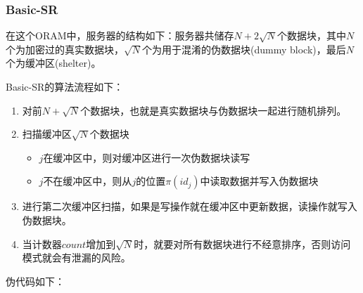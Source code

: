 \subsubsection{Basic-SR}
在这个ORAM中，服务器的结构如下：服务器共储存$N+2\sqrt{N}$个数据块，其中$N$个为加密过的真实数据块，$\sqrt{N}$个为用于混淆的伪数据块(dummy block)，最后$N$个为缓冲区(shelter)。\par
\noindent Basic-SR的算法流程如下：
\begin{enumerate}
    \item 对前$N+\sqrt N$个数据块，也就是真实数据块与伪数据块一起进行随机排列。
    \item 扫描缓冲区$\sqrt N$个数据块
    \begin{itemize}
        \item $j$在缓冲区中，则对缓冲区进行一次伪数据块读写
        \item $j$不在缓冲区中，则从$j$的位置$\pi(id_j)$中读取数据并写入伪数据块
    \end{itemize}
    \item 进行第二次缓冲区扫描，如果是写操作就在缓冲区中更新数据，读操作就写入伪数据块。
    \item 当计数器$count$增加到$\sqrt N$时，就要对所有数据块进行不经意排序，否则访问模式就会有泄漏的风险。
\end{enumerate}
伪代码如下：
